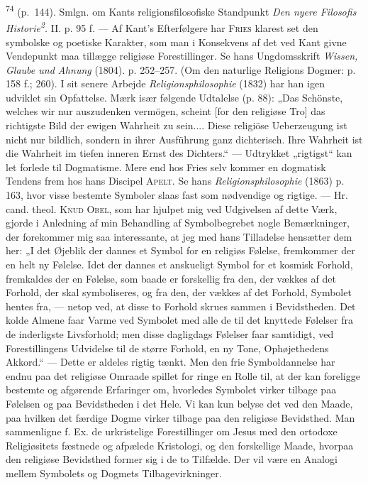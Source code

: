 \documentclass[12pt,a4paper,openany]{book}
\newcommand{\opage}[1]{\marginnote{\footnotesize\textit{[#1]}}}
\begin{document}
\begin{small}
\textsuperscript{74} (p.~144). Smlgn. om Kants religionsfilosofiske
Standpunkt \textit{Den nyere
Filosofis Historie\textsuperscript{2}.} II. p. 95 f. --- Af Kant’s
Efterfølgere har \textsc{Fries} klarest set den symbolske og poetiske
Karakter, som man i Konsekvens af det ved Kant givne Vendepunkt maa
tillægge religiøse Forestillinger. Se hans Ungdomsskrift \textit{Wissen,
Glaube und Ahnung} (1804). p. 252--257. (Om den naturlige Religions
Dogmer: p. 158 f.; 260). I sit senere Arbejde
\textit{Religionsphilosophie} (1832) har han igen udviklet sin
Opfattelse. Mærk især følgende Udtalelse (p. 88): „Das Schönste, welches
wir nur auszudenken vermögen, scheint [for den religiøse Tro] das
richtigste Bild der ewigen Wahrheit zu sein.... Diese religiöse
Ueberzeugung ist nicht nur bildlich, sondern in ihrer Ausführung ganz
dichterisch. Ihre Wahrheit ist die Wahrheit im tiefen inneren Ernst des
Dichters.“ --- Udtrykket „rigtigst“ kan let forlede til Dogmatisme. Mere
end hos Fries selv kommer en dogmatisk Tendens frem hos hans Discipel
\textsc{Apelt}. Se hans \textit{Religionsphilosophie} (1863) p. 163,
hvor visse bestemte Symboler slaas fast som nødvendige og rigtige. ---
Hr. cand. theol. \textsc{Knud Obel}, som har hjulpet mig ved Udgivelsen
af dette Værk, gjorde i Anledning af min Behandling af Symbolbegrebet
nogle Bemærkninger, der forekommer mig saa interessante, at jeg med hans
Tilladelse hensætter dem her: „I det Øjeblik der dannes et Symbol for en
religiøs Følelse, fremkommer der en helt ny Følelse. Idet der dannes et
anskueligt Symbol for et kosmisk Forhold, fremkaldes der en Følelse, som
baade er forskellig fra den, der vækkes af det Forhold, der skal
symboliseres, og fra den, der vækkes af det Forhold, Symbolet hentes
fra, --- netop ved, at disse to Forhold skrues sammen i Bevidstheden.
Det kolde Almene faar Varme
\opage{253}ved Symbolet med alle de til det knyttede Følelser fra de
inderligste Livsforhold; men disse dagligdags Følelser faar samtidigt,
ved Forestillingens Udvidelse til de større Forhold, en ny Tone,
Ophøjethedens Akkord.“ --- Dette er aldeles rigtig tænkt. Men den frie
Symboldannelse har endnu paa det religiøse Omraade spillet for ringe en
Rolle til, at der kan foreligge bestemte og afgørende Erfaringer om,
hvorledes Symbolet virker tilbage paa Følelsen og paa Bevidstheden i det
Hele. Vi kan kun belyse det ved den Maade, paa hvilken det færdige Dogme
virker tilbage paa den religiøse Bevidsthed. Man sammenligne f. Ex. de
urkristelige Forestillinger om Jesus med den ortodoxe Religiøsitets
fæstnede og afpælede Kristologi, og den forskellige Maade, hvorpaa den
religiøse Bevidsthed former sig i de to Tilfælde. Der vil være en
Analogi mellem Symbolets og Dogmets Tilbagevirkninger.


\end{small}
\end{document}
